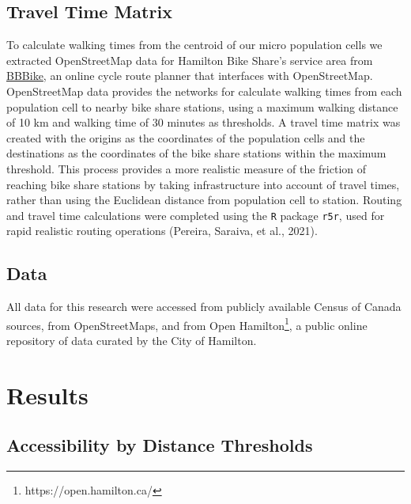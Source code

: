 \documentclass[]{elsarticle} %
\begin{document}
\hypertarget{travel-time-matrix}{%
\subsection{Travel Time Matrix}\label{travel-time-matrix}}

To calculate walking times from the centroid of our micro population
cells we extracted OpenStreetMap data for Hamilton Bike Share's service
area from \href{https://download.bbbike.org/osm/bbbike/}{BBBike}, an
online cycle route planner that interfaces with OpenStreetMap.
OpenStreetMap data provides the networks for calculate walking times
from each population cell to nearby bike share stations, using a maximum
walking distance of 10 km and walking time of 30 minutes as thresholds.
A travel time matrix was created with the origins as the coordinates of
the population cells and the destinations as the coordinates of the bike
share stations within the maximum threshold. This process provides a
more realistic measure of the friction of reaching bike share stations
by taking infrastructure into account of travel times, rather than using
the Euclidean distance from population cell to station. Routing and
travel time calculations were completed using the \texttt{R} package
\texttt{r5r}, used for rapid realistic routing operations (Pereira,
Saraiva, et al., 2021).

\hypertarget{data}{%
\subsection{Data}\label{data}}

All data for this research were accessed from publicly available Census
of Canada sources, from OpenStreetMaps, and from Open Hamilton\footnote{https://open.hamilton.ca/},
a public online repository of data curated by the City of Hamilton.

\hypertarget{results}{%
\section{Results}\label{results}}

\hypertarget{accessibility-by-distance-thresholds}{%
\subsection{Accessibility by Distance
Thresholds}\label{accessibility-by-distance-thresholds}}
\end{document}
